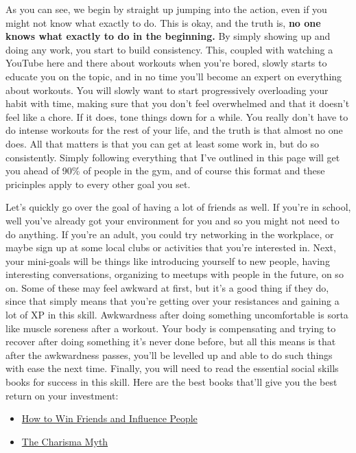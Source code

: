 \documentclass[
]{book}
\providecommand{\tightlist}{%
  \setlength{\itemsep}{0pt}\setlength{\parskip}{0pt}}
\begin{document}
As you can see, we begin by straight up jumping into the action, even if you might not know what exactly to do. This is okay, and the truth is, \textbf{no one knows what exactly to do in the beginning.} By simply showing up and doing any work, you start to build consistency. This, coupled with watching a YouTube here and there about workouts when you're bored, slowly starts to educate you on the topic, and in no time you'll become an expert on everything about workouts. You will slowly want to start progressively overloading your habit with time, making sure that you don't feel overwhelmed and that it doesn't feel like a chore. If it does, tone things down for a while. You really don't have to do intense workouts for the rest of your life, and the truth is that almost no one does. All that matters is that you can get at least some work in, but do so consistently. Simply following everything that I've outlined in this page will get you ahead of 90\% of people in the gym, and of course this format and these pricinples apply to every other goal you set.

Let's quickly go over the goal of having a lot of friends as well. If you're in school, well you've already got your environment for you and so you might not need to do anything. If you're an adult, you could try networking in the workplace, or maybe sign up at some local clubs or activities that you're interested in. Next, your mini-goals will be things like introducing yourself to new people, having interesting conversations, organizing to meetups with people in the future, on so on. Some of these may feel awkward at first, but it's a good thing if they do, since that simply means that you're getting over your resistances and gaining a lot of XP in this skill. Awkwardness after doing something uncomfortable is sorta like muscle soreness after a workout. Your body is compensating and trying to recover after doing something it's never done before, but all this means is that after the awkwardness passes, you'll be levelled up and able to do such things with ease the next time. Finally, you will need to read the essential social skills books for success in this skill. Here are the best books that'll give you the best return on your investment:

\begin{itemize}
\tightlist
\item
  \href{https://ia801004.us.archive.org/1/items/HowToWinFriendsAndInfluencePeopleBy/How\%20to\%20Win\%20Friends\%20and\%20Influence\%20People\%20by.pdf}{How to Win Friends and Influence People}
\item
  \href{https://docdro.id/y8ylh73}{The Charisma Myth}
\end{itemize}
\end{document}
